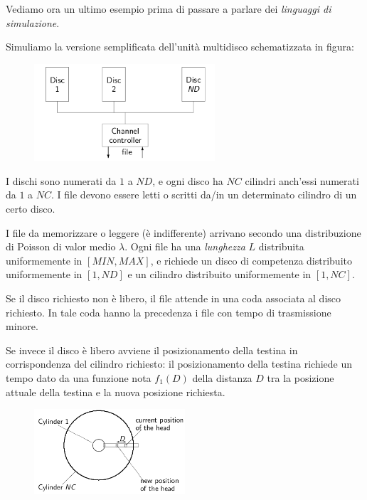 \documentclass[11pt]{book}
\begin{document}
Vediamo ora un ultimo esempio prima di passare a parlare dei {\em
  linguaggi di simulazione}.

Simuliamo la versione semplificata dell'unit\`a multidisco
schematizzata in figura:

\begin{figure}[H]
  \centering
  \includegraphics[width=0.6\textwidth]{images/cap11fig22.png}
\end{figure}

I dischi sono numerati da $1$ a $ND$, e ogni disco ha $NC$ cilindri
anch'essi numerati da $1$ a $NC$. I file devono essere letti o scritti
da/in un determinato cilindro di un certo disco.

I file da memorizzare o leggere (\`e indifferente) arrivano secondo una
distribuzione di Poisson di valor medio $\lambda$. Ogni file ha una
{\em lunghezza} $L$ distribuita uniformemente in $[MIN,MAX]$, e
richiede un disco di competenza distribuito uniformemente in $[1,ND]$
e un cilindro distribuito uniformemente in $[1,NC]$.

Se il disco richiesto non \`e libero, il file attende in una coda
associata al disco richiesto. In tale coda hanno la precedenza i file
con tempo di trasmissione minore.

Se invece il disco \`e libero avviene il posizionamento della testina
in corrispondenza del cilindro richiesto: il posizionamento della
testina richiede un tempo dato da una funzione nota $f_1(D)$ della
distanza $D$ tra la posizione attuale della testina e la nuova
posizione richiesta. 

\begin{figure}[H]
  \centering
  \includegraphics[width=0.5\textwidth]{images/cap11fig23.png}
\end{figure}
\end{document}
